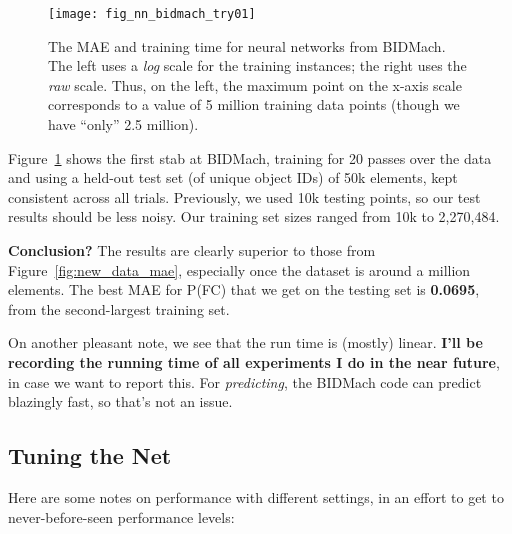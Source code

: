 \documentclass[a4paper, 11pt]{article}
\begin{document}
\begin{figure}[t]
  \centering
  \texttt{[image: fig\_nn\_bidmach\_try01]}
  \caption{The MAE and training time for neural networks from BIDMach. The left uses a \emph{log}
  scale for the training instances; the right uses the \emph{raw} scale. Thus, on the left, the
  maximum point on the x-axis scale corresponds to a value of 5 million training data points (though
  we have ``only'' 2.5 million).}
  \label{fig:bidmach_try01}
\end{figure}

Figure~\ref{fig:bidmach_try01} shows the first stab at BIDMach, training for 20 passes over the data
and using a held-out test set (of unique object IDs) of 50k elements, kept consistent across all
trials. Previously, we used 10k testing points, so our test results should be less noisy. Our
training set sizes ranged from 10k to 2,270,484.

\textbf{Conclusion?} The results are clearly superior to those from Figure~\ref{fig:new_data_mae},
especially once the dataset is around a million elements. The best MAE for P(FC) that we get on the
testing set is \textbf{0.0695}, from the second-largest training set.

On another pleasant note, we see that the run time is (mostly) linear. \textbf{I'll be recording the
running time of all experiments I do in the near future}, in case we want to report this. For
\emph{predicting}, the BIDMach code can predict blazingly fast, so that's not an issue.

\subsection{Tuning the Net}

Here are some notes on performance with different settings, in an effort to get to never-before-seen
performance levels:
\end{document}

